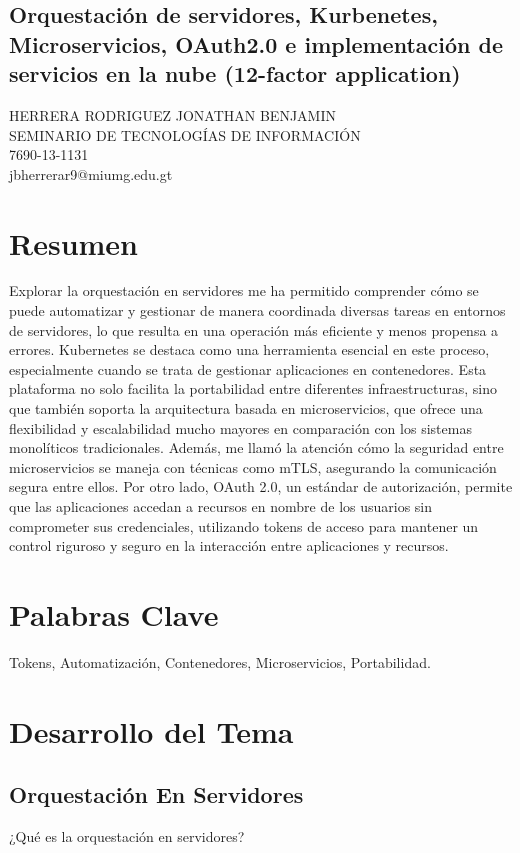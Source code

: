\documentclass[12pt]{article}
\begin{document}
\begin{center}
\section*{Orquestación de servidores, Kurbenetes, Microservicios, OAuth2.0 e implementación de servicios en la nube (12-factor application)}
HERRERA RODRIGUEZ JONATHAN BENJAMIN
\\SEMINARIO DE TECNOLOGÍAS DE INFORMACIÓN
\\7690-13-1131
\\jbherrerar9@miumg.edu.gt
\end{center}
\section{Resumen}

Explorar la orquestación en servidores me ha permitido comprender cómo se puede automatizar y gestionar de manera coordinada diversas tareas en entornos de servidores, lo que resulta en una operación más eficiente y menos propensa a errores. Kubernetes se destaca como una herramienta esencial en este proceso, especialmente cuando se trata de gestionar aplicaciones en contenedores. Esta plataforma no solo facilita la portabilidad entre diferentes infraestructuras, sino que también soporta la arquitectura basada en microservicios, que ofrece una flexibilidad y escalabilidad mucho mayores en comparación con los sistemas monolíticos tradicionales. Además, me llamó la atención cómo la seguridad entre microservicios se maneja con técnicas como mTLS, asegurando la comunicación segura entre ellos. Por otro lado, OAuth 2.0, un estándar de autorización, permite que las aplicaciones accedan a recursos en nombre de los usuarios sin comprometer sus credenciales, utilizando tokens de acceso para mantener un control riguroso y seguro en la interacción entre aplicaciones y recursos.

\section{Palabras Clave}
Tokens, Automatización, Contenedores, Microservicios, Portabilidad.

\section{Desarrollo del Tema}

\subsection*{Orquestación En Servidores}
¿Qué es la orquestación en servidores?
\end{document}

